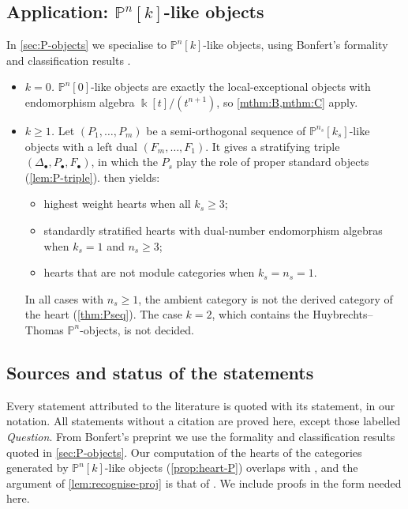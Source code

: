\documentclass[11pt,reqno]{amsart}
\theoremstyle{plain}
\theoremstyle{definition}
\theoremstyle{remark}
\newcommand{\kk}{\Bbbk}
\newcommand{\Pn}[2]{\mathbb{P}^{#1}[#2]}
\begin{document}
\subsection{Application: \texorpdfstring{$\mathbb{P}^n[k]$}{Pn[k]}-like objects}
In \cref{sec:P-objects} we specialise to $\Pn nk$-like objects, using Bonfert's formality and classification results \cite{Bonf26}.
\begin{itemize}
\item \emph{$k=0$.} $\Pn n0$-like objects are exactly the local-exceptional objects with endomorphism algebra $\kk[t]/(t^{n+1})$, so \cref{mthm:B,mthm:C} apply.
\item \emph{$k\ge1$.} Let $(P_1,\dots,P_m)$ be a semi-orthogonal sequence of $\Pn{n_s}{k_s}$-like objects with a left dual $(F_m,\dots,F_1)$. It gives a stratifying triple $(\Delta_\bullet,P_\bullet,F_\bullet)$, in which the $P_s$ play the role of proper standard objects (\cref{lem:P-triple}).  then yields:
\begin{itemize}
\item highest weight hearts when all $k_s\ge3$;
\item standardly stratified hearts with dual-number endomorphism algebras when $k_s=1$ and $n_s\ge3$;
\item hearts that are not module categories when $k_s=n_s=1$.
\end{itemize}
In all cases with $n_s\ge1$, the ambient category is not the derived category of the heart (\cref{thm:Pseq}). The case $k=2$, which contains the Huybrechts--Thomas $\mathbb{P}^n$-objects, is not decided.
\end{itemize}

\subsection*{Sources and status of the statements}
Every statement attributed to the literature is quoted with its statement, in our notation. All statements without a citation are proved here, except those labelled \emph{Question}. From Bonfert's preprint \cite{Bonf26} we use the formality and classification results quoted in \cref{sec:P-objects}. Our computation of the hearts of the categories generated by $\Pn nk$-like objects (\cref{prop:heart-P}) overlaps with \cite[Lemmas~3.11 and~4.15]{Bonf26}, and the argument of \cref{lem:recognise-proj} is that of \cite[Lemma~3.12]{Bonf26}. We include proofs in the form needed here.
\end{document}
